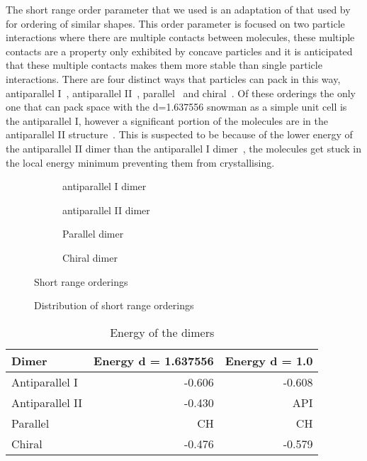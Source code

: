 The short range order parameter that we used is an adaptation of that used by~\textcite{} for ordering of similar shapes. This order parameter is focused on two particle interactions where there are multiple contacts between molecules, these multiple contacts are a property only exhibited by concave particles and it is anticipated that these multiple contacts makes them more stable than single particle interactions. There are four distinct ways that particles can pack in this way, antiparallel I~, antiparallel II~, parallel~ and chiral~. Of these orderings the only one that can pack space with the d=1.637556 snowman as a simple unit cell is the antiparallel I, however a significant portion of the molecules are in the antiparallel II structure~. This is suspected to be because of the lower energy of the antiparallel II dimer than the antiparallel I dimer~, the molecules get stuck in the local energy minimum preventing them from crystallising.

\begin{figure}
    \begin{subfigure}{0.5\textwidth}
        \caption{antiparallel I dimer}
        \label{fig:antiparallel i}
    \end{subfigure}
    \begin{subfigure}{0.5\textwidth}
        \caption{antiparallel II dimer}
        \label{fig:antiparallel ii}
    \end{subfigure}
    \begin{subfigure}{0.5\textwidth}
        \caption{Parallel dimer}
        \label{fig:parallel}
    \end{subfigure}
    \begin{subfigure}{0.5\textwidth}
        \caption{Chiral dimer}
        \label{fig:chiral}
    \end{subfigure}
    \caption{Short range orderings}
    \label{fig:short range order}
\end{figure}

\begin{figure}
    \caption{Distribution of short range orderings}
    \label{fig:short order hist}
\end{figure}

\begin{table}
    \centering
    \begin{tabular}{l r r}
        Dimer & Energy d = 1.637556 & Energy d = 1.0 \\ \hline
        Antiparallel I &  -0.606 & -0.608 \\
        Antiparallel II & -0.430 & API\\
        Parallel & CH & CH \\
        Chiral & -0.476 & -0.579 \\
    \end{tabular}
    \caption{Energy of the dimers}
    \label{tab:dimer energy}
\end{table}


\endbackmatter
